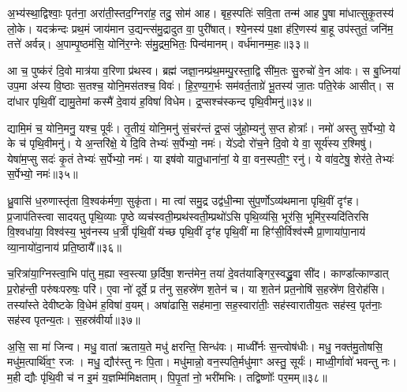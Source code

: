 {\anuvakamend[{आ मन्द॑स्व सान॒सिमेका॒न्नच॑त्वारि॒ꣳ॒शच्च॑॥७॥}]}

अ॒भ्य॑स्था॒द्विश्वाः॒ पृत॑ना॒ अरा॑ती॒स्तद॒ग्निरा॑ह॒ तदु॒ सोम॑ आह। बृह॒स्पतिः॑ सवि॒ता तन्म॑ आह पु॒षा मा॑धात्सुकृ॒तस्य॑ लो॒के। यदक्र॑न्दः प्रथ॒मं जाय॑मान उ॒द्यन्त्स॑मु॒द्रादुत वा॒ पुरी॑षात्। श्ये॒नस्य॑ प॒क्षा ह॑रि॒णस्य॑ बा॒हू उप॑स्तुतं॒ जनि॑म॒ तत्ते॑ अर्वन्न्। अ॒पाम्पृ॒ष्ठम॑सि॒ योनि॑र॒ग्नेः स॑मु॒द्रम॒भितः॒ पिन्व॑मानम्। वर्ध॑मानम्म॒हः॥३३॥

आ च॒ पुष्क॑रं दि॒वो मात्र॑या व॒रिणा प्र॑थस्व। ब्रह्म॑ जज्ञा॒नम्प्र॑थ॒मम्पु॒रस्ता॒द्वि सी॑म॒तः सु॒रुचो॑ वे॒न आ॑वः। स बु॒ध्निया॑ उप॒मा अ॑स्य वि॒ष्ठाः स॒तश्च॒ योनि॒मस॑तश्च॒ विवः॑। हि॒र॒ण्य॒ग॒र्भः सम॑वर्त॒ताग्रे॑ भू॒तस्य॑ जा॒तः पति॒रेक॑ आसीत्। स दा॑धार पृथि॒वीं द्यामु॒तेमां कस्मै॑ दे॒वाय॑ ह॒विषा॑ विधेम। द्र॒प्सश्च॑स्कन्द पृथि॒वीमनु॑॥३४॥

द्यामि॒मं च॒ योनि॒मनु॒ यश्च॒ पूर्वः॑। तृ॒तीयं॒ योनि॒मनु॑ सं॒चर॑न्तं द्र॒प्सं जु॑हो॒म्यनु॑ स॒प्त होत्राः᳚। नमो॑ अस्तु स॒र्पेभ्यो॒ ये के च॑ पृथि॒वीमनु॑। ये अ॒न्तरि॑क्षे॒ ये दि॒वि तेभ्यः॑ स॒र्पेभ्यो॒ नमः॑। ये॑\-ऽदो रो॑च॒ने दि॒वो ये वा॒ सूर्य॑स्य र॒श्मिषु॑। येषा॑म॒प्सु सदः॑ कृ॒तं तेभ्यः॑ स॒र्पेभ्यो॒ नमः॑। या इष॑वो यातु॒धाना॑नां॒ ये वा॒ वन॒स्पती॒ꣳ॒ रनु॑। ये वा॑व॒टेषु॒ शेर॑ते॒ तेभ्यः॑ स॒र्पेभ्यो॒ नमः॑॥३५॥

{\anuvakamend[{म॒हो\-ऽनु॑ यातु॒धाना॑ना॒मेका॑दश च॥८॥}]}

ध्रु॒वासि॑ ध॒रुणास्तृ॑ता वि॒श्वक॑र्मणा॒ सुकृ॑ता। मा त्वा॑ समु॒द्र उद्व॑धी॒न्मा सु॑प॒र्णो\-ऽव्य॑थमाना पृथि॒वीं दृꣳ॑ह। प्र॒जाप॑तिस्त्वा सादयतु पृथि॒व्याः पृ॒ष्ठे व्यच॑स्वती॒म्प्रथ॑स्वती॒म्प्रथो॑\-ऽसि पृथि॒व्य॑सि॒ भूर॑सि॒ भूमि॑र॒स्यदि॑तिरसि वि॒श्वधा॑या॒ विश्व॑स्य॒ भुव॑नस्य ध॒र्त्री पृ॑थि॒वीं य॑च्छ पृथि॒वीं दृꣳ॑ह पृथि॒वीं मा हिꣳ॑सी॒र्विश्व॑स्मै प्रा॒णाया॑पा॒नाय॑ व्या॒नायो॑दा॒नाय॑ प्रति॒ष्ठायै᳚॥३६॥

च॒रित्रा॑या॒ग्निस्त्वा॒भि पा॑तु म॒ह्या स्व॒स्त्या छ॒र्दिषा॒ शन्त॑मेन॒ तया॑ दे॒वत॑याङ्गिर॒स्वद्ध्रु॒वा सी॑द। काण्डा᳚त्काण्डात् प्र॒रोह॑न्ती॒ परु॑षःपरुषः॒ परि॑। ए॒वा नो॑ दूर्वे॒ प्र त॑नु स॒हस्रे॑ण श॒तेन॑ च। या श॒तेन॑ प्रत॒नोषि॑ स॒हस्रे॑ण वि॒रोह॑सि। तस्या᳚स्ते देवीष्टके वि॒धेम॑ ह॒विषा॑ व॒यम्। अषा॑ढासि॒ सह॑माना॒ सह॒स्वारा॑तीः॒ सह॑स्वारातीय॒तः सह॑स्व॒ पृत॑नाः॒ सह॑स्व पृतन्य॒तः। स॒हस्र॑वीर्या॥३७॥

अ॒सि॒ सा मा॑ जिन्व। मधु॒ वाता॑ ऋताय॒ते मधु॑ क्षरन्ति॒ सिन्ध॑वः। माध्वी᳚र्नः स॒न्त्वोष॑धीः। मधु॒ नक्त॑मु॒तोषसि॒ मधु॑म॒त्पार्थि॑व॒ꣳ॒ रजः। मधु॒ द्यौर॑स्तु नः पि॒ता। मधु॑मान्नो॒ वन॒स्पति॒र्मधु॑माꣳ अस्तु॒ सूर्यः॑। माध्वी॒र्गावो॑ भवन्तु नः। म॒ही द्यौः पृ॑थि॒वी च॑ न इ॒मं य॒ज्ञम्मि॑मिक्षताम्। पि॒पृ॒तां नो॒ भरी॑मभिः। तद्विष्णोः᳚ पर॒मम्॥३८॥

